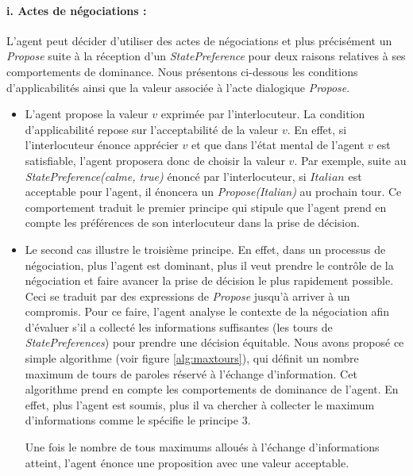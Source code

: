 		\paragraph{ i. Actes de négociations :}
			L'agent peut décider d'utiliser des actes de négociations et plus précisément un \emph{Propose} suite à la réception d'un \emph{StatePreference} pour deux raisons relatives à ses comportements de dominance. Nous présentons ci-dessous les conditions d'applicabilités ainsi que la valeur associée à l'acte dialogique \emph{Propose}. 
			\begin{itemize}
				
				\item L'agent propose la valeur $v$ exprimée par l'interlocuteur. La condition d'applicabilité repose sur l'acceptabilité de la valeur $v$. En effet, si l'interlocuteur énonce apprécier $v$ et que dans l'état mental de l'agent $v$ est satisfiable, l'agent proposera donc de choisir la valeur $v$. Par exemple, suite au \emph{StatePreference(calme, true)} énoncé par l'interlocuteur, si $Italian$ est acceptable pour l'agent, il énoncera un \emph{Propose(Italian)} au prochain tour. Ce comportement traduit le premier principe qui stipule que l'agent prend en compte les préférences de son interlocuteur dans la prise de décision.
				
				\item Le second cas illustre le troisième principe. En effet, dans un processus de négociation, plus l'agent est dominant, plus il veut prendre le contrôle de la négociation et faire avancer la prise de décision le plus rapidement possible. Ceci se traduit par des expressions de \emph{Propose} jusqu'à arriver à un compromis.
				Pour ce faire, l'agent analyse le contexte de la négociation afin d'évaluer s'il a collecté les informations suffisantes (les tours de \emph{StatePreferences}) pour prendre une décision équitable. Nous avons proposé ce simple algorithme (voir figure \ref{alg:maxtours}), qui définit un nombre maximum de tours de paroles réservé à l'échange d'information. Cet algorithme prend en compte les comportements de dominance de l'agent. En effet, plus l'agent est soumis, plus il va chercher à collecter le maximum d'informations comme le spécifie le principe 3. 
				
				Une fois le nombre de tous maximums alloués à l'échange d'informations atteint, l'agent énonce une proposition avec une valeur acceptable. 
								
			\end{itemize}
			
